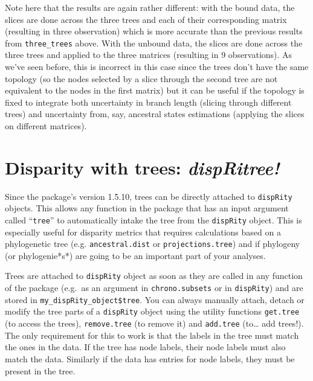 \documentclass[]{book}
\begin{document}
Note here that the results are again rather different: with the bound data, the slices are done across the three trees and each of their corresponding matrix (resulting in three observation) which is more accurate than the previous results from \texttt{three\_trees} above.
With the unbound data, the slices are done across the three trees and applied to the three matrices (resulting in 9 observations).
As we've seen before, this is incorrect in this case since the trees don't have the same topology (so the nodes selected by a slice through the second tree are not equivalent to the nodes in the first matrix) but it can be useful if the topology is fixed to integrate both uncertainty in branch length (slicing through different trees) and uncertainty from, say, ancestral states estimations (applying the slices on different matrices).

\hypertarget{disparity-with-trees-dispritree}{%
\section{\texorpdfstring{Disparity with trees: \emph{dispRitree!}}{Disparity with trees: dispRitree!}}\label{disparity-with-trees-dispritree}}

Since the package's version 1.5.10, trees can be directly attached to \texttt{dispRity} objects.
This allows any function in the package that has an input argument called ``\texttt{tree}'' to automatically intake the tree from the \texttt{dispRity} object.
This is especially useful for disparity metrics that requires calculations based on a phylogenetic tree (e.g. \texttt{ancestral.dist} or \texttt{projections.tree}) and if phylogeny (or phylogenie*s*) are going to be an important part of your analyses.

Trees are attached to \texttt{dispRity} object as soon as they are called in any function of the package (e.g.~as an argument in \texttt{chrono.subsets} or in \texttt{dispRity}) and are stored in \texttt{my\_dispRity\_object\$tree}.
You can always manually attach, detach or modify the tree parts of a \texttt{dispRity} object using the utility functions \texttt{get.tree} (to access the trees), \texttt{remove.tree} (to remove it) and \texttt{add.tree} (to\ldots{} add trees!).
The only requirement for this to work is that the labels in the tree must match the ones in the data.
If the tree has node labels, their node labels must also match the data.
Similarly if the data has entries for node labels, they must be present in the tree.
\end{document}
